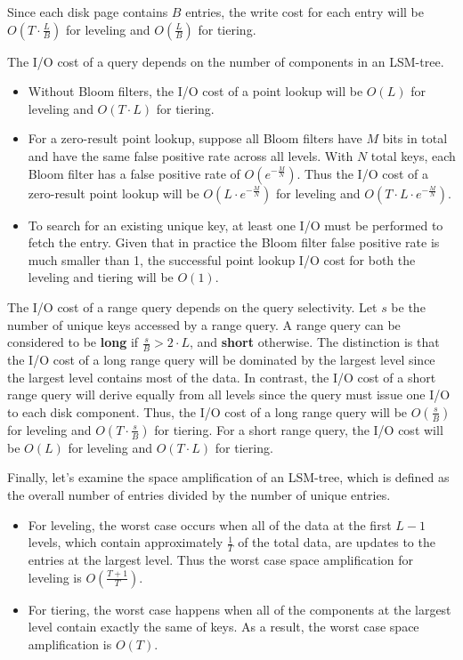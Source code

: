 \documentclass[11pt]{article}
\begin{document}
Since each disk page contains \(B\) entries, the write cost for each entry will be
\(O(T\cdot\frac{L}{B})\) for leveling and \(O(\frac{L}{B})\) for tiering.

The I/O cost of a query depends on the number of components in an LSM-tree.
\begin{itemize}
\item Without Bloom filters, the I/O cost of a point lookup will be \(O(L)\) for leveling and
\(O(T\cdot L)\) for tiering.
\item For a zero-result point lookup, suppose all Bloom filters have \(M\) bits in total and have the same
false positive rate across all levels. With \(N\) total keys, each Bloom filter has a false positive
rate of \(O(e^{-\frac{M}{N}})\). Thus the I/O cost of a zero-result point lookup will be
\(O(L\cdot e^{-\frac{M}{N}})\) for leveling and \(O(T\cdot L\cdot e^{-\frac{M}{N}})\).
\item To search for an existing unique key, at least one I/O must be performed to fetch the entry. Given
that in practice the Bloom filter false positive rate is much smaller than 1, the successful point
lookup I/O cost for both the leveling and tiering will be \(O(1)\).
\end{itemize}

The I/O cost of a range query depends on the query selectivity. Let \(s\) be the number of unique keys
accessed by a range query. A range query can be considered to be \textbf{long} if \(\frac{s}{B}>2\cdot L\), and
\textbf{short} otherwise. The distinction is that the I/O cost of a long range query will be dominated by the
largest level since the largest level contains most of the data. In contrast, the I/O cost of a short
range query will derive equally from all levels since the query must issue one I/O to each disk
component. Thus, the I/O cost of a long range query will be \(O(\frac{s}{B})\) for leveling and
\(O(T\cdot\frac{s}{B})\) for tiering. For a short range query, the I/O cost will be \(O(L)\) for
leveling and \(O(T\cdot L)\) for tiering.

Finally, let's examine the space amplification of an LSM-tree, which is defined as the overall number
of entries divided by the number of unique entries.
\begin{itemize}
\item For leveling, the worst case occurs when all of the data at the first \(L-1\) levels, which contain
approximately \(\frac{1}{T}\) of the total data, are updates to the entries at the largest level.
Thus the worst case space amplification for leveling is \(O(\frac{T+1}{T})\).
\item For tiering, the worst case happens when all of the components at the largest level contain exactly
the same of keys. As a result, the worst case space amplification is \(O(T)\).
\end{itemize}
\end{document}
